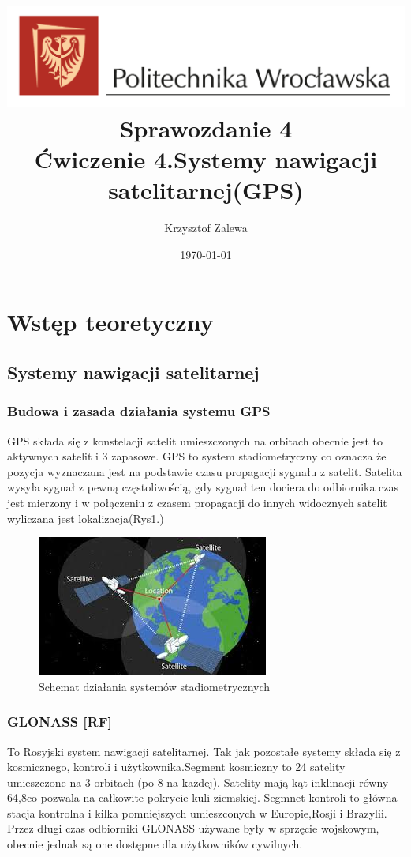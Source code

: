 \documentclass{article}
\title{
  \centering
  \includegraphics[width=\textwidth]{src/images/logo_PWr_kolor_poziom.png}\\
  \fontsize{28pt}{30pt}\selectfont Sprawozdanie 4\\
  \fontsize{14pt}{30pt}\selectfont Ćwiczenie 4.Systemy nawigacji satelitarnej(GPS)}
\author{Krzysztof Zalewa}
\date{\daymonthyear\today}
\begin{document}
  \maketitle
  \pagebreak
  \tableofcontents
  \pagebreak
  \section{Wstęp teoretyczny}
    \subsection{Systemy nawigacji satelitarnej}
    \subsubsection{Budowa i zasada działania systemu GPS}
    GPS składa się z konstelacji satelit umieszczonych na orbitach obecnie jest to aktywnych satelit i 3 zapasowe.
    GPS to system stadiometryczny co oznacza że pozycja wyznaczana jest na podstawie czasu propagacji sygnału z 
    satelit. Satelita wysyła sygnał z pewną częstoliwością, gdy sygnał ten dociera do odbiornika czas jest mierzony 
    i w połączeniu z czasem propagacji do innych widocznych satelit wyliczana jest lokalizacja(Rys1.)
    \begin{figure}[ht]
      \centering
      \includegraphics[width=\textwidth]{src/images/GPS.jpg}
      \caption{Schemat działania systemów stadiometrycznych}
      \label{fig:gps}
    \end{figure}
    \subsubsection{GLONASS [RF]}
    \sloppy
    To Rosyjski system nawigacji satelitarnej. Tak jak pozostałe systemy składa się z kosmicznego, kontroli i 
    użytkownika.Segment kosmiczny to 24 satelity umieszczone na 3 orbitach (po 8 na każdej). Satelity mają kąt 
    inklinacji równy 64,8\degree co pozwala na całkowite pokrycie kuli ziemskiej. Segmnet kontroli to główna stacja 
    kontrolna i kilka pomniejszych umieszconych w Europie,Rosji i Brazylii. Przez długi czas odbiorniki GLONASS 
    używane były w sprzęcie wojskowym, obecnie jednak są one dostępne dla użytkowników cywilnych.
\end{document}
